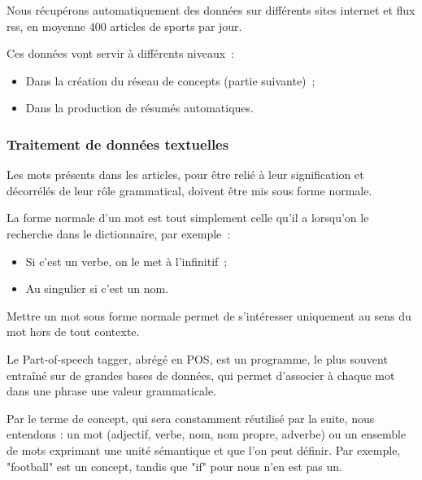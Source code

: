 \documentclass[a4paper, 12pt]{article}
\begin{document}
Nous récupérons automatiquement des données sur différents sites internet et flux rss, en moyenne 400 articles de sports par jour.

Ces données vont servir à différents niveaux~:
\begin{itemize}
 \item Dans la création du réseau de concepts (partie suivante)~;
 \item Dans la production de résumés automatiques.
\end{itemize}



\subsubsection{Traitement de données textuelles}

Les mots présents dans les articles, pour être relié à leur signification et décorrélés de leur rôle grammatical, doivent être mis sous forme normale.

\begin{definition}
La forme normale d'un mot est tout simplement celle qu'il a lorsqu'on le recherche dans le dictionnaire, par exemple~:
\begin{itemize}
 \item Si c'est un verbe, on le met à l'infinitif~;
 \item Au singulier si c'est un nom.
\end{itemize}
Mettre un mot sous forme normale permet de s'intéresser uniquement au sens du mot hors de tout contexte.
\end{definition}


\begin{definition}
Le Part-of-speech tagger, abrégé en POS, est un programme, le plus souvent entraîné sur de grandes bases de données, qui permet d'associer à chaque mot dans une phrase une valeur grammaticale.
\end{definition}

\begin{definition}[Concept]
Par le terme de concept, qui sera constamment réutilisé par la suite, nous entendons : un mot (adjectif, verbe, nom, nom propre, adverbe) ou un ensemble de mots exprimant une unité sémantique et que l'on peut définir. Par exemple, "football" est un concept, tandis que "if" pour nous n'en est pas un.
\end{definition}
\end{document}
